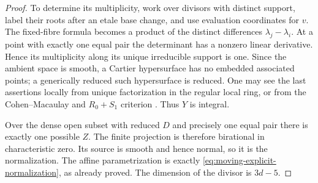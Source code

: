 \begin{proof}
To determine its multiplicity, work over divisors with distinct
support, label their roots after an etale base change, and use
evaluation coordinates for $v$. The fixed-fibre formula becomes a
product of the distinct differences $\lambda_j-\lambda_i$. At a
point with exactly one equal pair the determinant has a nonzero
linear derivative. Hence its multiplicity along its unique
irreducible support is one. Since the ambient space is smooth, a
Cartier hypersurface has no embedded associated points; a
generically reduced such hypersurface is reduced. One may see the
last assertions locally from unique factorization in the regular
local ring, or from the Cohen--Macaulay and $R_0+S_1$ criterion
\cite[Tag 031R]{Stacks}. Thus $Y$ is integral.

Over the dense open subset with reduced $D$ and precisely one equal
pair there is exactly one possible $Z$. The finite projection is
therefore birational in characteristic zero. Its source is smooth
and hence normal, so it is the normalization. The affine
parametrization is exactly \eqref{eq:moving-explicit-normalization},
as already proved. The dimension of the divisor is $3d-5$.
\end{proof}

